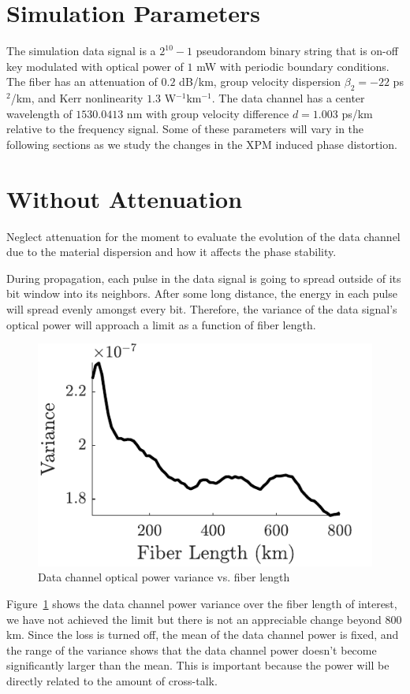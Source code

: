 \section{Simulation Parameters}

The simulation data signal is a $2^{10}-1$ pseudorandom binary string that is on-off key modulated with optical power of $1$ mW with periodic boundary conditions. The fiber has an attenuation of $0.2$ dB/km, group velocity dispersion $\beta_2 = -22$ ps$^2$/km, and Kerr nonlinearity $1.3$ W$^{-1}$km$^{-1}$. The data channel has a center wavelength of $1530.0413$ nm with group velocity difference $d = 1.003$ ps/km relative to the frequency signal. Some of these parameters will vary in the following sections as we study the changes in the XPM induced phase distortion.


\section{Without Attenuation}

Neglect attenuation for the moment to evaluate the evolution of the data channel due to the material dispersion and how it affects the phase stability.

During propagation, each pulse in the data signal is going to spread outside of its bit window into its neighbors. After some long distance, the energy in each pulse will spread evenly amongst every bit. Therefore, the variance of the data signal's optical power will approach a limit as a function of fiber length.
%
\begin{figure}[htb]
	\centering
	\includegraphics{img/NACalcVar}
	\caption{Data channel optical power variance vs. fiber length} \label{fig:NACalcVar}
\end{figure}
%
Figure~\ref{fig:NACalcVar} shows the data channel power variance over the fiber length of interest, we have not achieved the limit but there is not an appreciable change beyond $800$ km. Since the loss is turned off, the mean of the data channel power is fixed, and the range of the variance shows that the data channel power doesn't become significantly larger than the mean. This is important because the power will be directly related to the amount of cross-talk.

